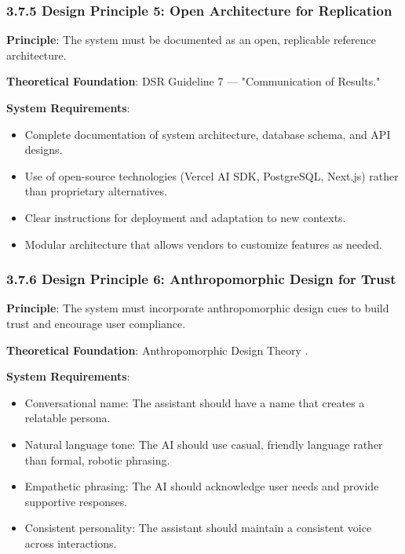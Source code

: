 \documentclass[12pt,a4paper]{article}
\begin{document}
\subsubsection{3.7.5 Design Principle 5: Open Architecture for Replication}

\textbf{Principle}: The system must be documented as an open, replicable reference architecture.

\textbf{Theoretical Foundation}: DSR Guideline 7 \citep{hevner2004} --- "Communication of Results."

\textbf{System Requirements}:

\begin{itemize}
    \item Complete documentation of system architecture, database schema, and API designs.
    \item Use of open-source technologies (Vercel AI SDK, PostgreSQL, Next.js) rather than proprietary alternatives.
    \item Clear instructions for deployment and adaptation to new contexts.
    \item Modular architecture that allows vendors to customize features as needed.
\end{itemize}

\subsubsection{3.7.6 Design Principle 6: Anthropomorphic Design for Trust}

\textbf{Principle}: The system must incorporate anthropomorphic design cues to build trust and encourage user compliance.

\textbf{Theoretical Foundation}: Anthropomorphic Design Theory \citep{adam2021, hamedani2026}.

\textbf{System Requirements}:

\begin{itemize}
    \item Conversational name: The assistant should have a name that creates a relatable persona.
    \item Natural language tone: The AI should use casual, friendly language rather than formal, robotic phrasing.
    \item Empathetic phrasing: The AI should acknowledge user needs and provide supportive responses.
    \item Consistent personality: The assistant should maintain a consistent voice across interactions.
\end{itemize}
\end{document}
